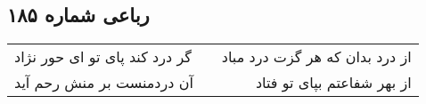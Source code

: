 \begin{center}
\section*{رباعی شماره ۱۸۵}
\label{sec:sh185}
\begin{longtable}{l p{0.5cm} r}
گر درد کند پای تو ای حور نژاد
&&
از درد بدان که هر گزت درد مباد
\\
آن دردمنست بر منش رحم آید
&&
از بهر شفاعتم بپای تو فتاد
\\
\end{longtable}
\end{center}
